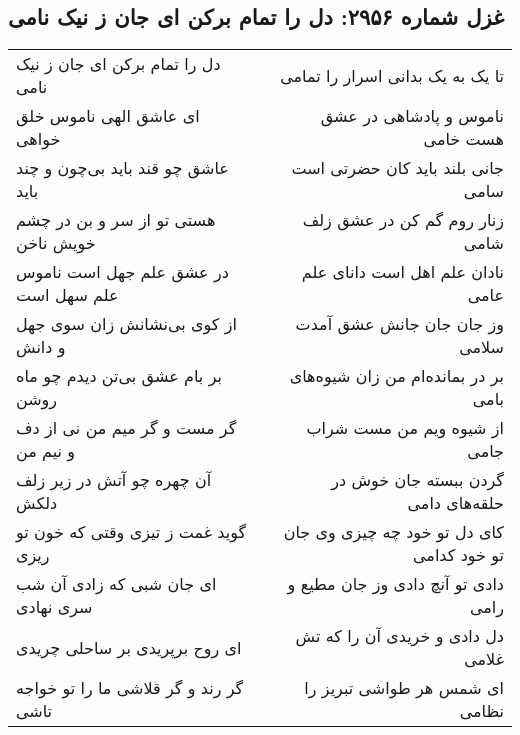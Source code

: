 \begin{center}
\section*{غزل شماره ۲۹۵۶: دل را تمام برکن ای جان ز نیک نامی}
\label{sec:2956}
\begin{longtable}{l p{0.5cm} r}
دل را تمام برکن ای جان ز نیک نامی
&&
تا یک به یک بدانی اسرار را تمامی
\\
ای عاشق الهی ناموس خلق خواهی
&&
ناموس و پادشاهی در عشق هست خامی
\\
عاشق چو قند باید بی‌چون و چند باید
&&
جانی بلند باید کان حضرتی است سامی
\\
هستی تو از سر و بن در چشم خویش ناخن
&&
زنار روم گم کن در عشق زلف شامی
\\
در عشق علم جهل است ناموس علم سهل است
&&
نادان علم اهل است دانای علم عامی
\\
از کوی بی‌نشانش زان سوی جهل و دانش
&&
وز جان جان جانش عشق آمدت سلامی
\\
بر بام عشق بی‌تن دیدم چو ماه روشن
&&
بر در بمانده‌ام من زان شیوه‌های بامی
\\
گر مست و گر میم من نی از دف و نیم من
&&
از شیوه ویم من مست شراب جامی
\\
آن چهره چو آتش در زیر زلف دلکش
&&
گردن ببسته جان خوش در حلقه‌های دامی
\\
گوید غمت ز تیزی وقتی که خون تو ریزی
&&
کای دل تو خود چه چیزی وی جان تو خود کدامی
\\
ای جان شبی که زادی آن شب سری نهادی
&&
دادی تو آنچ دادی وز جان مطیع و رامی
\\
ای روح برپریدی بر ساحلی چریدی
&&
دل دادی و خریدی آن را که تش غلامی
\\
گر رند و گر قلاشی ما را تو خواجه تاشی
&&
ای شمس هر طواشی تبریز را نظامی
\\
\end{longtable}
\end{center}
